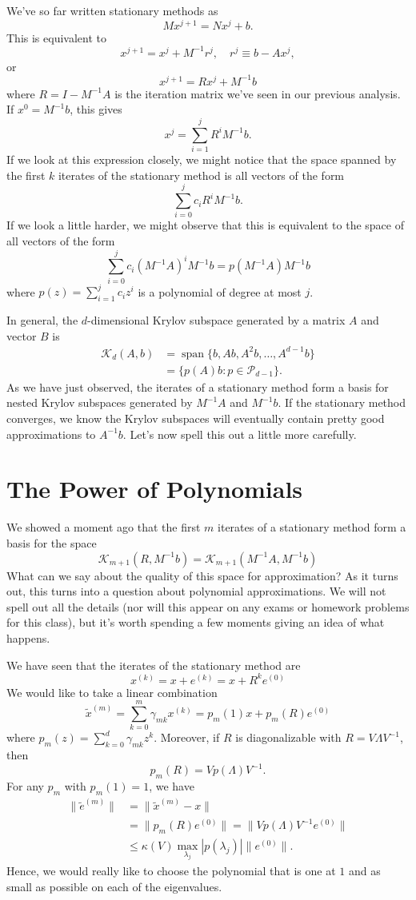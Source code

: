 \documentclass[12pt, leqno]{article}
\newcommand{\calK}{\mathcal{K}}
\newcommand{\calP}{\mathcal{P}}
\begin{document}
We've so far written stationary methods as
\[
  M x^{j+1} = N x^j + b.
\]
This is equivalent to
\[
  x^{j+1} = x^j + M^{-1} r^j, \quad r^j \equiv b-Ax^j,
\]
or
\[
  x^{j+1} = R x^j + M^{-1} b
\]
where $R = I-M^{-1} A$ is the iteration matrix we've seen
in our previous analysis.  If $x^0 = M^{-1} b$, this gives
\[
  x^j = \sum_{i=1}^j R^i M^{-1} b.
\]
If we look at this expression closely, we might notice that
the space spanned by the first $k$ iterates of the stationary
method is all vectors of the form
\[
  \sum_{i=0}^j c_i R^i M^{-1} b.
\]
If we look a little harder, we might observe that this is equivalent
to the space of all vectors of the form
\[
  \sum_{i=0}^j c_i (M^{-1} A)^i M^{-1} b = p(M^{-1} A) M^{-1} b
\]
where $p(z) = \sum_{i=1}^j c_i z^i$ is a polynomial of degree at most
$j$.

In general, the $d$-dimensional Krylov subspace generated by
a matrix $A$ and vector $B$ is
\begin{align*}
  \calK_d(A,b)
  &= \operatorname{span}\{ b, Ab, A^2 b, \ldots, A^{d-1} b \} \\
  &= \{ p(A) b : p \in \calP_{d-1} \}.
\end{align*}
As we have just observed, the iterates of a stationary method
form a basis for nested Krylov subspaces generated by $M^{-1}A$
and $M^{-1}b$.  If the stationary method converges, we know
the Krylov subspaces will eventually contain pretty good
approximations to $A^{-1} b$.  Let's now spell this out a little
more carefully.

\section*{The Power of Polynomials}

We showed a moment ago that the first $m$ iterates of a stationary
method form a basis for the space
\[
  \calK_{m+1}(R, M^{-1}b) = \calK_{m+1}(M^{-1} A, M^{-1} b)
\]
What can we say about the quality of this space for approximation?  As
it turns out, this turns into a question about polynomial
approximations.  We will not spell out all the details (nor will this
appear on any exams or homework problems for this class), but it's
worth spending a few moments giving an idea of what happens.

We have seen that the iterates of the stationary method are
\[
  x^{(k)} = x + e^{(k)} = x + R^k e^{(0)}
\]
We would like to take a linear combination
\[
  \tilde x^{(m)} = \sum_{k=0}^m \gamma_{mk} x^{(k)} = p_m(1) x + p_m(R) e^{(0)}
\]
where $p_m(z) = \sum_{k=0}^d \gamma_{mk} z^k$.  Moreover,
if $R$ is diagonalizable with $R = V \Lambda V^{-1}$, then
\[
  p_m(R) = V p(\Lambda) V^{-1}.
\]
For any $p_m$ with $p_m(1) = 1$, we have
\begin{align*}
\|\tilde{e}^{(m)}\|
&= \|\tilde{x}^{(m)}-x\| \\
&= \|p_m(R) e^{(0)}\| = \|V p(\Lambda) V^{-1} e^{(0)}\| \\
&\leq \kappa(V) \max_{\lambda_j} |p(\lambda_j)| \|e^{(0)}\|.
\end{align*}
Hence, we would really like to choose the polynomial that is one
at $1$ and as small as possible on each of the eigenvalues.
\end{document}

